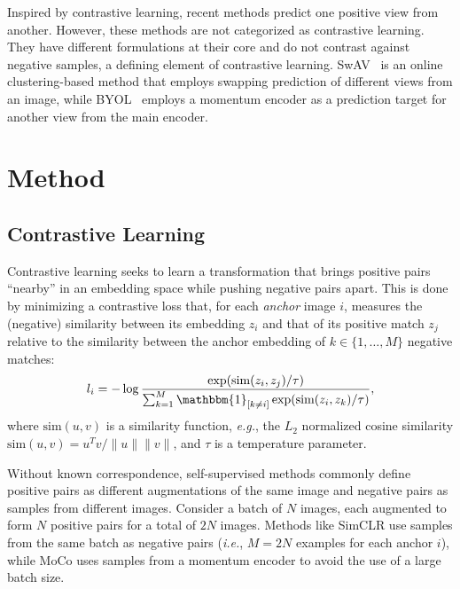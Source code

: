 \documentclass[10pt,twocolumn,letterpaper]{article}
\begin{document}
Inspired by contrastive learning, recent methods predict one positive view from another. However, these methods are not categorized as contrastive learning. They have different formulations at their core and do not contrast against negative samples, a defining element of contrastive learning. SwAV~\cite{caron2020unsupervised} is an online clustering-based method that employs swapping prediction of different views from an image, while BYOL~\cite{grill2020bootstrap} employs a momentum encoder as a prediction target for another view from the main encoder.





 \section{Method}
\label{sec:method}

\subsection{Contrastive Learning}
Contrastive learning seeks to learn a transformation that brings positive pairs ``nearby'' in an embedding space while pushing negative pairs apart. This is done by minimizing a contrastive loss that, for each \emph{anchor} image $i$, measures the (negative) similarity between its embedding $z_i$ and that of its positive match $z_j$ relative to the similarity between the anchor embedding of $k \in \{1, \ldots, M\}$ negative matches:
\begin{equation}
    l_{i}=-\log\frac{\exp(\textrm{sim}(z_i,z_j)/\tau)}{\sum_{k=1}^{M} \mathbbm{1}_{[k\ne i]}\exp(\textrm{sim}(z_i,z_k)/\tau)},
\label{eq:contrastive_loss}
\end{equation}
where $\textrm{sim}(u,v)$ is a similarity function, \emph{e.g.}, the $L_2$ normalized cosine similarity $\textrm{sim}(u,v) = u^Tv/\lVert u\rVert \lVert v\rVert$, and $\tau$ is a temperature parameter.

Without known correspondence, self-supervised methods commonly define positive pairs as different augmentations of the same image and negative pairs as samples from different images. Consider a batch of $N$ images, each augmented to form $N$ positive pairs for a total of $2N$ images. Methods like SimCLR use samples from the same batch as negative pairs (\emph{i.e.}, $M = 2N$ examples for each anchor $i$), while MoCo uses samples from a momentum encoder to avoid the use of a large batch size.
\end{document}
